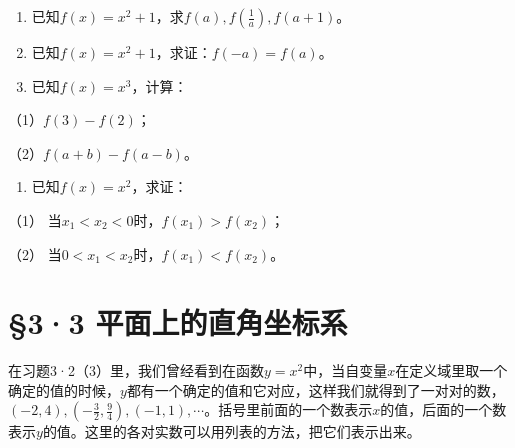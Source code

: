 {\centering
\scriptsize\setlength{\tabcolsep}{2.2pt}%
\par
}

\begin{enumerate}[start=3]
\item
  已知\(f(x) = x^2 + 1\)，求\(f(a), f\left(\frac{1}{a}\right), f(a + 1)\)。
\item
  已知\(f(x) = x^2 + 1\)，求证：\(f(-a) = f(a)\)。
\item
  已知\(f(x) = x^3\)，计算：
\end{enumerate}

（1）\(f(3) - f(2)\)；

（2）\(f(a + b) - f(a - b)\)。

\begin{enumerate}[start=6]
\item
  已知\(f(x) = x^2\)，求证：
\end{enumerate}

（1） 当\(x_{1}<x_{2}<0\)时，\(f(x_{1})>f(x_{2})\)；

（2） 当\(0 < x_{1} < x_{2}\)时，\(f(x_{1}) < f(x_{2})\)。

\section{§3·3 平面上的直角坐标系}

在习题3·2（3）里，我们曾经看到在函数\(y = x^2\)中，当自变量\(x\)在定义域里取一个确定的值的时候，\(y\)都有一个确定的值和它对应，这样我们就得到了一对对的数，\((-2, 4), \left(-\frac{3}{2}, \frac{9}{4}\right), (-1, 1), \cdots\)。括号里前面的一个数表示\(x\)的值，后面的一个数表示\(y\)的值。这里的各对实数可以用列表的方法，把它们表示出来。

{\centering
\scriptsize\setlength{\tabcolsep}{2.2pt}%
\par
}

